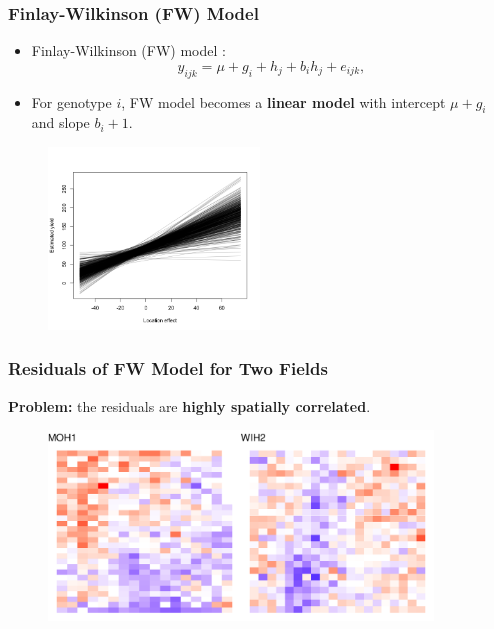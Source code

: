 \documentclass{beamer}
\begin{document}
\begin{frame}
	\frametitle{Finlay-Wilkinson (FW) Model}
	\begin{itemize}
	\item Finlay-Wilkinson (FW) model \citep{finlay1963analysis}: 
	$$y_{ijk} = \mu + g_i + h_j + b_i h_j + e_{ijk},$$
 \item For genotype $i$, FW model becomes a \textbf{linear model} with intercept $\mu + g_i$ and slope $b_i + 1 $.
	\end{itemize}		
	\pause
		\begin{figure}[H]
		\centering
		\includegraphics[width = 0.5\textwidth]{image8.png}
	\end{figure}
\end{frame}






\begin{frame}
	\frametitle{Residuals of FW Model for Two Fields}
	\textbf{Problem:} the residuals are \textbf{highly spatially correlated}.
	\begin{figure}[H]
		\centering
		\includegraphics[width = 0.91\textwidth]{resid_plot_2.pdf}
	\end{figure}
\end{frame}
\end{document}
